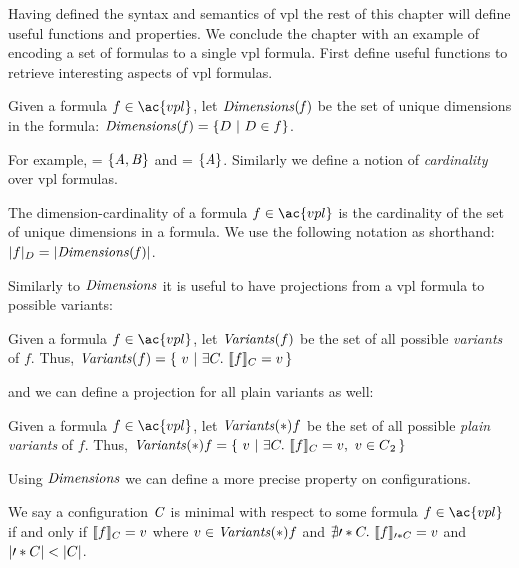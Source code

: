 \label{section:vpl:formalism}
%
Having defined the syntax and semantics of \ac{vpl} the rest of this chapter
will define useful functions and properties. We conclude the chapter with an
example of encoding a set of \pl{} formulas to a single \ac{vpl} formula.
%
First define useful functions to retrieve interesting aspects of \ac{vpl}
formulas.

\begin{definition}[Dimensions]
  Given a formula $f \in \ac{vpl}$, let $\mathit{Dimensions(f)}$ be the set of unique
  dimensions in the formula:  $\mathit{Dimensions(f)} = \{ D\ |\ D \in f \}$.
\end{definition}

For example,  = $\{\mathit{A,B}\}$ and
 = $\{\mathit{A}\}$.
%
Similarly we define a notion of \emph{cardinality} over \ac{vpl} formulas.
%
\begin{definition}
  The dimension-cardinality of a formula $f \in \ac{vpl}$ is the cardinality of
  the set of unique dimensions in a formula. We use the following notation as
  shorthand: $|f|_{D} = |{\mathit{Dimensions(f)}}|$.
\end{definition}

Similarly to $\mathit{Dimensions}$ it is useful to have projections from a \ac{vpl}
formula to possible variants:
%
\begin{definition}[Variants]
  Given a formula $f \in \ac{vpl}$, let $\mathit{Variants}(f)$ be the set of all
  possible \emph{variants} of $f$. Thus, $\variants{f} = \{\ v\ |\ \exists
  C.\ \sem[C]{f} = v \,\}$
\end{definition}
%
and we can define a projection for all plain variants as well:
%
\begin{definition}[\pl{} Variants]
  Given a formula $f \in \ac{vpl}$, let $\mathit{Variants}(*){f}$ be the set of all
  possible \emph{plain variants} of $f$. Thus, $\variants*{f} = \{\ v\ |\ \exists C.\
  \sem[C]{f} = v,\ v \in \pl{} \,\}$
\end{definition}
%
Using $\mathit{Dimensions}$ we can define a more precise property on configurations.
%
\begin{definition}
  We say a configuration $\mathit{C}$ is minimal with respect to some formula $f \in
  \ac{vpl}$ if and only if $ \sem[C]{f} = v$ where $v \in
  \mathit{Variants}(*){f}$ and $\nexists \prime*{C} .\ \sem[\prime*{C}]{f} = v$
  and $|\prime*{C}| < |C|$.
\end{definition}

